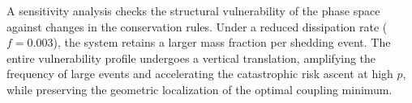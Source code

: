 A sensitivity analysis checks the structural vulnerability of the phase space against changes in the conservation rules. Under a reduced dissipation rate ($f = 0.003$), the system retains a larger mass fraction per shedding event.\cite{brummitt2012suppressing} The entire vulnerability profile undergoes a vertical translation, amplifying the frequency of large events and accelerating the catastrophic risk ascent at high $p$, while preserving the geometric localization of the optimal coupling minimum.\cite{brummitt2012suppressing}
